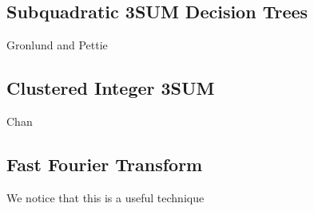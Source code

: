 \documentclass[12pt]{article}
\begin{document}
\subsection*{Subquadratic 3SUM Decision Trees}
Gronlund and Pettie

\subsection*{Clustered Integer 3SUM}
Chan 

\subsection*{Fast Fourier Transform}
We notice that this is a useful technique

\subsection*{}
\end{document}
